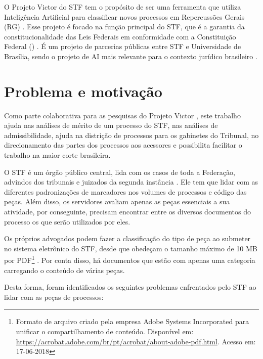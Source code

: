 O Projeto Victor do STF tem o propósito de ser uma ferramenta que utiliza Inteligência Artificial para classificar novos processos em Repercussões Gerais (RG) \cite{supremo_tribunal_federal_inteligencia_2018}. Esse projeto é focado na função principal do STF, que é a garantia da constitucionalidade das Leis Federais em conformidade com a Constituição Federal (\citeyear{brasil_constituicao_1988}) \cite{brasil_constituicao_1988}. É um projeto de parcerias públicas entre STF e Universidade de Brasília, sendo o projeto de AI mais relevante para o contexto jurídico brasileiro \cite{supremo_tribunal_federal_inteligencia_2018}. 


\section{Problema e motivação}\label{sec:problema}

Como parte colaborativa para as pesquisas do Projeto Victor \cite{supremo_tribunal_federal_inteligencia_2018}, este trabalho ajuda nas análises de mérito de um processo do STF, nas análises de admissibilidade, ajuda na distrição de processos para os gabinetes do Tribunal, no direcionamento das partes dos processos aos acessores e possibilita facilitar o trabalho na maior corte brasileira.

O STF é um órgão público central, lida com os casos de toda a Federação, advindos dos tribunais e juizados da segunda instância \cite{brasil_constituicao_1988}. Ele tem que lidar com as diferentes padronizações de marcadores nos volumes de processos e código das peças. Além disso, os servidores avaliam apenas as peças essenciais a sua atividade, por conseguinte, precisam encontrar entre os diversos documentos do processo os que serão utilizados por eles.

Os próprios advogados podem fazer a classificação do tipo de peça ao submeter no sistema eletrônico do STF, desde que obedeçam o tamanho máximo de 10 MB por PDF\footnote{Formato de arquivo criado pela empresa Adobe Systems Incorporated para unificar o compartilhamento de conteúdo. Disponível em: \url{https://acrobat.adobe.com/br/pt/acrobat/about-adobe-pdf.html}. Acesso em: 17-06-2018} \cite{noauthor_resolucao_2010}. Por conta disso, há documentos que estão com apenas uma categoria carregando o conteúdo de várias peças.

Desta forma, foram identificados os seguintes problemas enfrentados pelo STF ao lidar com as peças de processos:

